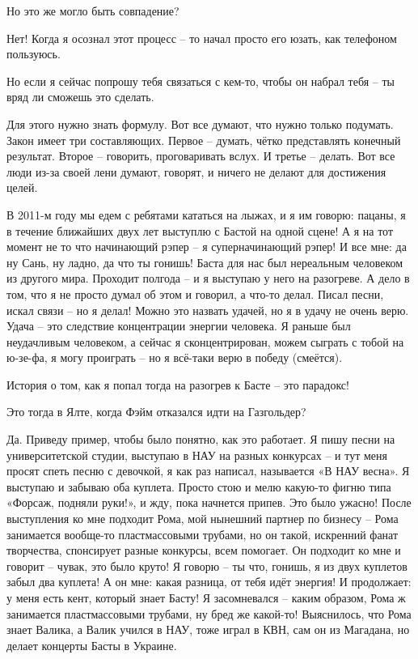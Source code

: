 Но это же могло быть совпадение?

Нет!  Когда я осознал этот процесс – то начал просто его юзать, как телефоном
пользуюсь.

Но если я сейчас попрошу тебя связаться с кем-то, чтобы он набрал тебя – ты
вряд ли сможешь это сделать.

Для этого нужно знать формулу. Вот все думают, что нужно только подумать. Закон
имеет три составляющих. Первое – думать, чётко представлять конечный результат.
Второе – говорить, проговаривать вслух. И третье – делать. Вот все люди из-за
своей лени думают, говорят, и ничего не делают для достижения целей.

В 2011-м году мы едем с ребятами кататься на лыжах, и я им говорю: пацаны, я в
течение ближайших двух лет выступлю с Бастой на одной сцене! А я на тот момент
не то что начинающий рэпер – я суперначинающий рэпер! И все мне: да ну Сань, ну
ладно, да что ты гонишь! Баста для нас был нереальным человеком из другого
мира. Проходит полгода – и я выступаю у него на разогреве. А дело в том, что я
не просто думал об этом и говорил, а что-то делал. Писал песни, искал связи –
но я делал! Можно это назвать удачей, но я в удачу не очень верю. Удача – это
следствие концентрации энергии человека. Я раньше был неудачливым человеком, а
сейчас я сконцентрирован, можем сыграть с тобой на ю-зе-фа, я могу проиграть –
но я всё-таки верю в победу (смеётся).

История о том, как я попал тогда на разогрев к Басте – это парадокс!

Это тогда в Ялте, когда Фэйм отказался идти на Газгольдер?

Да. Приведу пример, чтобы было понятно, как это работает. Я пишу песни на
университетской студии, выступаю в НАУ на разных конкурсах – и тут меня просят
спеть песню с девочкой, я как раз написал, называется «В НАУ весна». Я выступаю
и забываю оба куплета. Просто стою и мелю какую-то фигню типа «Форсаж, подняли
руки!», и жду, пока начнется припев. Это было ужасно! После выступления ко мне
подходит Рома, мой нынешний партнер по бизнесу – Рома занимается вообще-то
пластмассовыми трубами, но он такой, искренний фанат творчества, спонсирует
разные конкурсы, всем помогает. Он подходит ко мне и говорит – чувак, это было
круто! Я говорю – ты что, гонишь, я из двух куплетов забыл два куплета! А он
мне: какая разница, от тебя идёт энергия! И продолжает: у меня есть кент,
который знает Басту! Я засомневался – каким образом, Рома ж занимается
пластмассовыми трубами, ну бред же какой-то! Выяснилось, что Рома знает Валика,
а Валик учился в НАУ, тоже играл в КВН, сам он из Магадана, но делает концерты
Басты в Украине.

